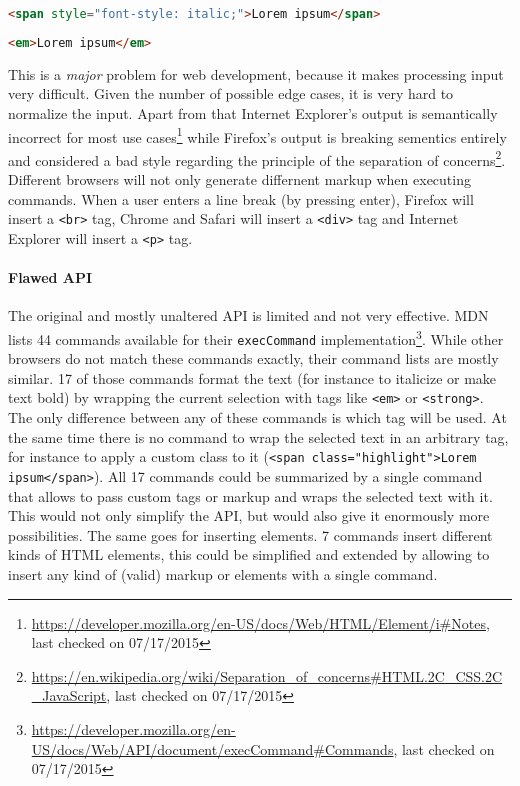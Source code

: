 \begin{lstlisting}[language=html, caption=Markup of italic command in Firefox, label=lst:italic-firefox]
<span style="font-style: italic;">Lorem ipsum</span>
\end{lstlisting}

\begin{lstlisting}[language=html, caption=Markup of italic command in Chrome, label=lst:italic-chrome]
<em>Lorem ipsum</em>
\end{lstlisting}

\noindent This is a \textit{major} problem for web development, because it makes processing input very difficult. Given the number of possible edge cases, it is very hard to normalize the input. Apart from that Internet Explorer's output is semantically incorrect for most use cases\footnote{\url{https://developer.mozilla.org/en-US/docs/Web/HTML/Element/i\#Notes}, last checked on 07/17/2015} while Firefox's output is breaking sementics entirely and considered a bad style regarding the principle of the separation of concerns\footnote{\url{https://en.wikipedia.org/wiki/Separation\_of\_concerns\#HTML.2C\_CSS.2C\_JavaScript}, last checked on 07/17/2015}.
Different browsers will not only generate differnent markup when executing commands. When a user enters a line break (by pressing enter), Firefox will insert a \texttt{<br>} tag, Chrome and Safari will insert a \texttt{<div>} tag and Internet Explorer will insert a \texttt{<p>} tag.


\paragraph{Flawed API} 

The original and mostly unaltered API is limited and not very effective. MDN lists 44 commands available for their \texttt{execCommand} implementation\footnote{\url{https://developer.mozilla.org/en-US/docs/Web/API/document/execCommand\#Commands}, last checked on 07/17/2015}. While other browsers do not match these commands exactly, their command lists are mostly similar. 17 of those commands format the text (for instance to italicize or make text bold) by wrapping the current selection with tags like \texttt{<em>} or \texttt{<strong>}. The only difference between any of these commands is which tag will be used. At the same time there is no command to wrap the selected text in an arbitrary tag, for instance to apply a custom class to it (\texttt{<span class="highlight">Lorem ipsum</span>}). All 17 commands could be summarized by a single command that allows to pass custom tags or markup and wraps the selected text with it. This would not only simplify the API, but would also give it enormously more possibilities. The same goes for inserting elements. 7 commands insert different kinds of HTML elements, this could be simplified and extended by allowing to insert any kind of (valid) markup or elements with a single command. 

